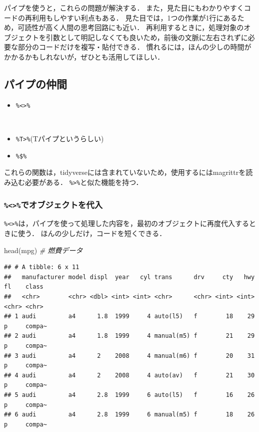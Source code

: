 \documentclass[
]{article}
\newenvironment{Shaded}{\begin{snugshade}}{\end{snugshade}}
\newcommand{\CommentTok}[1]{\textcolor[rgb]{0.56,0.35,0.01}{\textit{#1}}}
\newcommand{\FunctionTok}[1]{\textcolor[rgb]{0.00,0.00,0.00}{#1}}
\newcommand{\NormalTok}[1]{#1}
\providecommand{\tightlist}{%
  \setlength{\itemsep}{0pt}\setlength{\parskip}{0pt}}
\begin{document}
パイプを使うと，これらの問題が解決する．
また，見た目にもわかりやすくコードの再利用もしやすい利点もある．
見た目では，1つの作業が1行にあるため，可読性が高く人間の思考回路にも近い．
再利用するときに，処理対象のオブジェクトを引数として明記しなくても良いため，前後の文脈に左右されずに必要な部分のコードだけを複写・貼付できる．
慣れるには，ほんの少しの時間がかかるかもしれないが，ぜひとも活用してほしい．

\hypertarget{ux30d1ux30a4ux30d7ux306eux4ef2ux9593}{%
\subsection{パイプの仲間}\label{ux30d1ux30a4ux30d7ux306eux4ef2ux9593}}

\begin{itemize}
\tightlist
\item
  \texttt{\%\textless{}\textgreater{}\%}\strut \\
\item
  \texttt{\%T\textgreater{}\%}(Tパイプというらしい)\\
\item
  \texttt{\%\$\%}
\end{itemize}

これらの関数は，tidyverseには含まれていないため，使用するにはmagrittrを読み込む必要がある．
\texttt{\%\textgreater{}\%}と似た機能を持つ．

\hypertarget{ux3067ux30aaux30d6ux30b8ux30a7ux30afux30c8ux3092ux4ee3ux5165}{%
\subsubsection{\texorpdfstring{\texttt{\%\textless{}\textgreater{}\%}でオブジェクトを代入}{\%\textless\textgreater\%でオブジェクトを代入}}\label{ux3067ux30aaux30d6ux30b8ux30a7ux30afux30c8ux3092ux4ee3ux5165}}

\texttt{\%\textless{}\textgreater{}\%}は，パイプを使って処理した内容を，最初のオブジェクトに再度代入するときに使う．
ほんの少しだけ，コードを短くできる．

\begin{Shaded}
\begin{Highlighting}[]
\FunctionTok{head}\NormalTok{(mpg) }\CommentTok{\# 燃費データ}
\end{Highlighting}
\end{Shaded}

\begin{verbatim}
## # A tibble: 6 x 11
##   manufacturer model displ  year   cyl trans      drv     cty   hwy fl    class 
##   <chr>        <chr> <dbl> <int> <int> <chr>      <chr> <int> <int> <chr> <chr> 
## 1 audi         a4      1.8  1999     4 auto(l5)   f        18    29 p     compa~
## 2 audi         a4      1.8  1999     4 manual(m5) f        21    29 p     compa~
## 3 audi         a4      2    2008     4 manual(m6) f        20    31 p     compa~
## 4 audi         a4      2    2008     4 auto(av)   f        21    30 p     compa~
## 5 audi         a4      2.8  1999     6 auto(l5)   f        16    26 p     compa~
## 6 audi         a4      2.8  1999     6 manual(m5) f        18    26 p     compa~
\end{verbatim}
\end{document}
